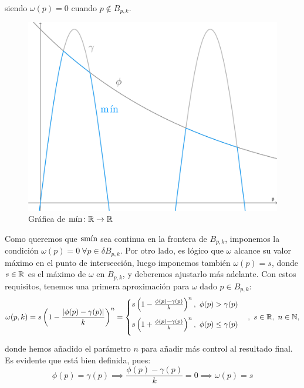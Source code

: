 siendo $\omega(p) = 0$ cuando $p\notin B_{p,k}$. 

\begin{figure}[t]
    \centering
    \includegraphics[width=\textwidth]{Plantilla-TFG-master/img/smooth_real.png}
    \caption{Gráfica de $\Min\colon \R\to\R$}
    \label{fig:min_real}
\end{figure}

Como queremos que $\smin$ sea continua en la frontera de $B_{p,k}$, imponemos la condición $\omega(p) = 0\ \forall p \in \delta B_{p,k}$. Por otro lado, es lógico que $\omega$ alcance su valor máximo en el punto de intersección, luego imponemos también $\omega(p) = s$, donde $s\in\R$ es el máximo de $\omega$ en $B_{p,k}$, y deberemos ajustarlo más adelante. Con estos requisitos, tenemos una primera aproximación para $\omega$ dado $p\in B_{p,k}$:
\begin{equation*}
    \omega(p,k) = s\left( 1-\frac{|\phi(p)-\gamma(p)|}{k} \right)^n = \begin{cases}
        s\left( 1-\frac{\phi(p)-\gamma(p)}{k}\right)^n,\ \phi(p)>\gamma(p) \\[10pt]
        s\left( 1+\frac{\phi(p)-\gamma(p)}{k}\right)^n,\ \phi(p)\le \gamma(p)\\[10pt]
    \end{cases}  ,\ s\in\R,\ n\in\N,
\end{equation*}
donde hemos añadido el parámetro $n$ para añadir más control al resultado final. Es evidente que está bien definida, pues:
\begin{equation*}
    \phi(p)=\gamma(p) \implies \frac{\phi(p)-\gamma(p)}{k} = 0\implies \omega(p) = s
\end{equation*}


